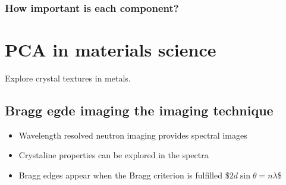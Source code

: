 \documentclass[letterpaper,10pt,english]{sphinxmanual}
\begin{document}
\noindent{}


\subsection{How important is each component?}
\label{\detokenize{06-ShapeAnalysis:how-important-is-each-component}}
\begin{sphinxVerbatim}[commandchars=\\\{\}]
       
\PYG{p}{[}\PYG{p}{]}
\end{sphinxVerbatim}

\noindent{}


\chapter{PCA in materials science}
\label{\detokenize{06-ShapeAnalysis:pca-in-materials-science}}
\sphinxAtStartPar
Explore crystal textures in metals.


\section{Bragg egde imaging \sphinxhyphen{} the imaging technique}
\label{\detokenize{06-ShapeAnalysis:bragg-egde-imaging-the-imaging-technique}}\begin{itemize}
\item {} 
\sphinxAtStartPar
Wavelength resolved neutron imaging provides spectral images

\item {} 
\sphinxAtStartPar
Crystaline properties can be explored in the spectra

\item {} 
\sphinxAtStartPar
Bragg edges appear when the Bragg criterion is fulfilled
\$\(2d\sin{\theta}=n\lambda{}\)\$

\end{itemize}
\end{document}
